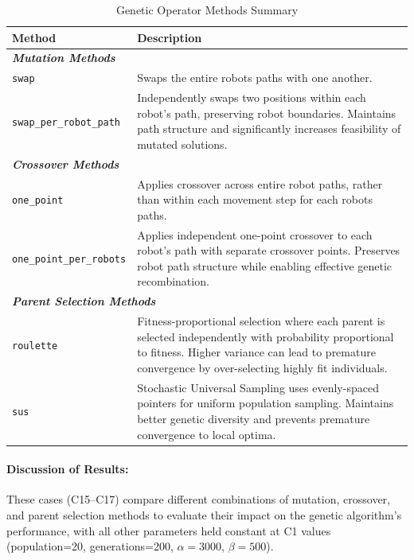 \begin{table}[H]
\centering
\caption{Genetic Operator Methods Summary}
\begin{tabular}{@{}p{4cm}p{10cm}@{}}
\toprule
\textbf{Method} & \textbf{Description} \\
\midrule
\multicolumn{2}{l}{\textit{\textbf{Mutation Methods}}} \\
\midrule
\texttt{swap} & 
Swaps the entire robots paths with one another. \\
\midrule
\texttt{swap\_per\_robot\_path} & 
Independently swaps two positions within each robot's path, preserving robot boundaries. Maintains path structure and significantly increases feasibility of mutated solutions. \\
\midrule
\multicolumn{2}{l}{\textit{\textbf{Crossover Methods}}} \\
\midrule
\texttt{one\_point} & 
Applies crossover across entire robot paths, rather than within each movement step for each robots paths. \\
\midrule
\texttt{one\_point\_per\_robots} & 
Applies independent one-point crossover to each robot's path with separate crossover points. Preserves robot path structure while enabling effective genetic recombination. \\
\midrule
\multicolumn{2}{l}{\textit{\textbf{Parent Selection Methods}}} \\
\midrule
\texttt{roulette} & 
Fitness-proportional selection where each parent is selected independently with probability proportional to fitness. Higher variance can lead to premature convergence by over-selecting highly fit individuals. \\
\midrule
\texttt{sus} & 
Stochastic Universal Sampling uses evenly-spaced pointers for uniform population sampling. Maintains better genetic diversity and prevents premature convergence to local optima. \\
\bottomrule
\end{tabular}
\label{tab:ga_method_summary}
\end{table}

\paragraph{Discussion of Results:}
These cases (C15–C17) compare different combinations of mutation, crossover, and parent selection methods to evaluate their impact on the genetic algorithm's performance, with all other parameters held constant at C1 values (population=20, generations=200, $\alpha=3000$, $\beta=500$).

